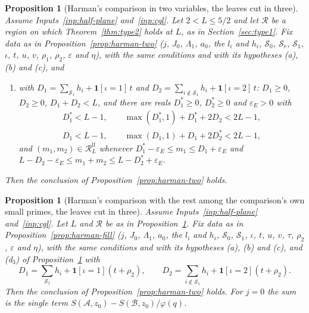 \documentclass[11pt]{article}
\newtheorem{proposition}[theorem]{Proposition}
\theoremstyle{definition}
\begin{document}
\begin{proposition}[Harman's comparison in two variables, the leaves cut in three]\label{prop:harman-two3}
Assume Inputs~\ref{inp:half-plane} and~\ref{inp:cgl}. Let $2 < L \le 5/2$ and let $\mathcal R$ be a region on which
Theorem~\ref{thm:type2} holds at $L$, as in Section~\ref{sec:type1}. Fix data as in
Proposition~\ref{prop:harman-two} ($j$, $J_0$, $\Lambda_1$, $a_0$, the $l_i$ and $h_i$, $\mathcal S_0$, $\mathcal S_r$,
$\mathcal S_1$, $\iota$, $t$, $u$, $v$, $\rho_1$, $\rho_2$, $\varepsilon$ and $\eta$), with the same conditions and with
its hypotheses (a), (b) and (c), and
\begin{enumerate}
\item[(d$_3$)] with $D_1 = \sum_{\mathcal S_1} h_i + \mathbf 1[\iota = 1]\, t$ and $D_2 = \sum_{i \notin \mathcal S_1}
  h_i + \mathbf 1[\iota = 2]\, t$: $D_1 \ge 0$, $D_2 \ge 0$, $D_1 + D_2 < L$, and there are reals $D_1^* \ge 0$, $D_2^*
  \ge 0$ and $\varepsilon_E > 0$ with
  \begin{gather*}
    D_1^* < L - 1, \qquad \max(D_1^*, 1) + D_1^* + 2D_2 < 2L - 1, \\
    D_1 < L - 1, \qquad \max(D_1, 1) + D_1 + 2D_2^* < 2L - 1,
  \end{gather*}
  and $(m_1, m_2) \in \mathcal R^{\mathrm{lf}}_L$ whenever $D_1^* - \varepsilon_E \le m_1 \le D_1 + \varepsilon_E$ and
  $L - D_2 - \varepsilon_E \le m_1 + m_2 \le L - D_2^* + \varepsilon_E$.
\end{enumerate}
Then the conclusion of Proposition~\ref{prop:harman-two} holds.
\end{proposition}

\begin{proposition}[Harman's comparison with the rest among the comparison's own small primes, the leaves cut in
three]\label{prop:harman-fill3}
Assume Inputs~\ref{inp:half-plane} and~\ref{inp:cgl}. Let $L$ and $\mathcal R$ be as in
Proposition~\ref{prop:harman-two3}. Fix data as in Proposition~\ref{prop:harman-fill} ($j$, $J_0$, $\Lambda_1$,
$a_0$, the $l_i$ and $h_i$, $\mathcal S_0$, $\mathcal S_1$, $\iota$, $t$, $u$, $v$, $\tau$, $\rho_2$, $\varepsilon$ and
$\eta$), with the same conditions and with its hypotheses (a), (b) and (c), and (d$_3$) of
Proposition~\ref{prop:harman-two3} with
\[
  D_1 = \sum_{\mathcal S_1} h_i + \mathbf 1[\iota = 1](t + \rho_2), \qquad D_2 = \sum_{i \notin \mathcal S_1} h_i +
  \mathbf 1[\iota = 2](t + \rho_2).
\]
Then the conclusion of Proposition~\ref{prop:harman-two} holds. For $j = 0$ the sum is the single term $S(\mathcal A,
z_0) - S(\mathcal B, z_0)/\varphi(q)$.
\end{proposition}
\end{document}
